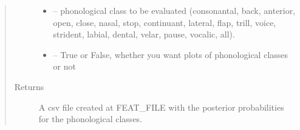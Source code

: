 \documentclass[letterpaper,10pt,english]{sphinxmanual}
\begin{document}
\begin{fulllineitems}
\begin{fulllineitems}
\begin{quote}
\begin{description}
\begin{itemize}
\item {} 
 -- phonological class to be evaluated (\sphinxquotedblleft{}consonantal\sphinxquotedblright{}, \sphinxquotedblleft{}back\sphinxquotedblright{}, \sphinxquotedblleft{}anterior\sphinxquotedblright{}, \sphinxquotedblleft{}open\sphinxquotedblright{}, \sphinxquotedblleft{}close\sphinxquotedblright{}, \sphinxquotedblleft{}nasal\sphinxquotedblright{}, \sphinxquotedblleft{}stop\sphinxquotedblright{},
\sphinxquotedblleft{}continuant\sphinxquotedblright{},  \sphinxquotedblleft{}lateral\sphinxquotedblright{}, \sphinxquotedblleft{}flap\sphinxquotedblright{}, \sphinxquotedblleft{}trill\sphinxquotedblright{}, \sphinxquotedblleft{}voice\sphinxquotedblright{}, \sphinxquotedblleft{}strident\sphinxquotedblright{},
\sphinxquotedblleft{}labial\sphinxquotedblright{}, \sphinxquotedblleft{}dental\sphinxquotedblright{}, \sphinxquotedblleft{}velar\sphinxquotedblright{}, \sphinxquotedblleft{}pause\sphinxquotedblright{}, \sphinxquotedblleft{}vocalic\sphinxquotedblright{}, \sphinxquotedblleft{}all\sphinxquotedblright{}).

\item {} 
 -- True or False, whether you want plots of phonological classes or not

\end{itemize}

\item[{Returns}] \leavevmode
A csv file created at FEAT\_FILE with the posterior probabilities for the phonological classes.

\end{description}\end{quote}

\begin{sphinxVerbatim}[commandchars=\\\{\}]
\PYG{p}{[}\PYG{p}{]} 
  
\end{sphinxVerbatim}


\end{fulllineitems}
\end{fulllineitems}
\end{document}

